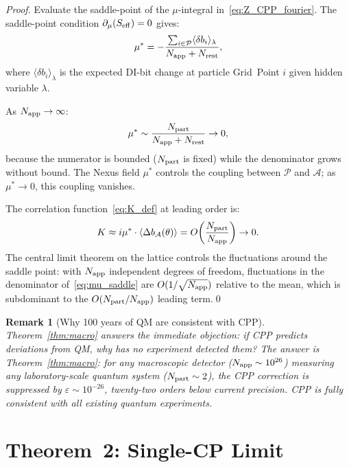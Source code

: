 \documentclass[11pt,letterpaper]{article}
\newtheorem{remark}[theorem]{Remark}
\newcommand{\eps}{\varepsilon}
\newcommand{\Napp}{N_{\rm app}}
\newcommand{\Npart}{N_{\rm part}}
\begin{document}
\begin{proof}
Evaluate the saddle-point of the $\mu$-integral in~\eqref{eq:Z_CPP_fourier}.
The saddle-point condition $\partial_\mu(S_{\rm eff}) = 0$ gives:
\begin{equation}
\mu^* = -\frac{\sum_{i\in\mathcal{P}}\langle\delta b_i\rangle_\lambda}
             {\Napp + N_{\rm rest}},
\label{eq:mu_saddle}
\end{equation}
where $\langle\delta b_i\rangle_\lambda$ is the expected DI-bit
change at particle Grid~Point $i$ given hidden variable $\lambda$.

As $\Napp \to \infty$:
\begin{equation}
\mu^* \sim \frac{\Npart}{\Napp + N_{\rm rest}} \to 0,
\label{eq:mu_zero}
\end{equation}
because the numerator is bounded ($\Npart$ is fixed) while the
denominator grows without bound.  The Nexus field $\mu^*$ controls
the coupling between $\mathcal{P}$ and $\mathcal{A}$; as $\mu^* \to
0$, this coupling vanishes.

The correlation function~\eqref{eq:K_def} at leading order is:
\begin{equation}
K \approx i\mu^* \cdot \langle\Delta b_{\mathcal{A}}(\theta)\rangle
= O\!\left(\frac{\Npart}{\Napp}\right) \to 0.
\label{eq:K_leading}
\end{equation}
The central limit theorem on the lattice controls the fluctuations
around the saddle point: with $\Napp$ independent degrees of freedom,
fluctuations in the denominator of~\eqref{eq:mu_saddle} are
$O(1/\sqrt{\Napp})$ relative to the mean, which is subdominant
to the $O(\Npart/\Napp)$ leading term.\qed
\end{proof}

\begin{remark}[Why 100 years of QM are consistent with CPP]
Theorem~\ref{thm:macro} answers the immediate objection: if CPP
predicts deviations from QM, why has no experiment detected them?
The answer is Theorem~\ref{thm:macro}: for any macroscopic
detector ($\Napp \sim 10^{26}$) measuring any laboratory-scale
quantum system ($\Npart \sim 2$), the CPP correction is suppressed
by $\eps \sim 10^{-26}$, twenty-two orders below current precision.
CPP is fully consistent with all existing quantum experiments.
\end{remark}

\section{Theorem~2: Single-CP Limit}
\label{sec:single}
\end{document}
